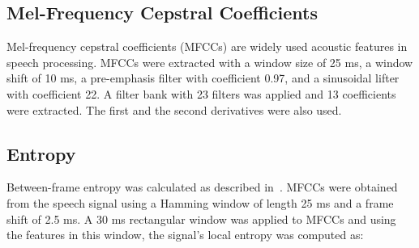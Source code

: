 
 


\subsection{Mel-Frequency Cepstral Coefficients}

Mel-frequency cepstral coefficients (MFCCs) are widely used acoustic features in speech processing.  %
MFCCs were extracted with a window size of 25 ms, a window shift of 10 ms, a pre-emphasis filter with coefficient 0.97, and a sinusoidal lifter with coefficient 22. A filter bank with 23 filters was applied and 13 coefficients were extracted. 
The first and the second derivatives were also used. %

\subsection{Entropy}

Between-frame entropy was calculated as described in~\cite{you2004entropy}. MFCCs were obtained from the speech signal using a Hamming window of length 25 ms and a frame shift of 2.5 ms. A 30 ms rectangular window was applied to MFCCs and using the features in this window, the signal's local entropy was computed as:

